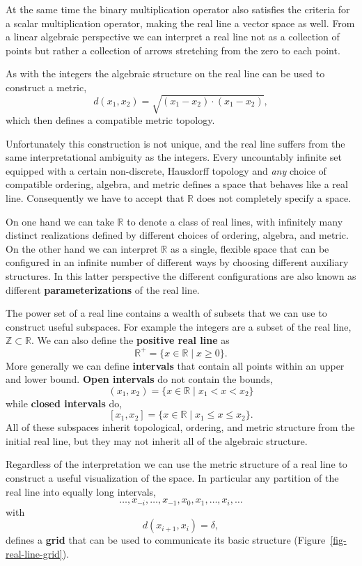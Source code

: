 \documentclass[
  letterpaper,
  DIV=11,
  numbers=noendperiod]{scrartcl}
\begin{document}
At the same time the binary multiplication operator also satisfies the
criteria for a scalar multiplication operator, making the real line a
vector space as well. From a linear algebraic perspective we can
interpret a real line not as a collection of points but rather a
collection of arrows stretching from the zero to each point.

As with the integers the algebraic structure on the real line can be
used to construct a metric, \[
d(x_{1}, x_{2}) = \sqrt{ (x_{1} - x_{2}) \cdot (x_{1} - x_{2}) },
\] which then defines a compatible metric topology.

Unfortunately this construction is not unique, and the real line suffers
from the same interpretational ambiguity as the integers. Every
uncountably infinite set equipped with a certain non-discrete, Hausdorff
topology and \emph{any} choice of compatible ordering, algebra, and
metric defines a space that behaves like a real line. Consequently we
have to accept that \(\mathbb{R}\) does not completely specify a space.

On one hand we can take \(\mathbb{R}\) to denote a class of real lines,
with infinitely many distinct realizations defined by different choices
of ordering, algebra, and metric. On the other hand we can interpret
\(\mathbb{R}\) as a single, flexible space that can be configured in an
infinite number of different ways by choosing different auxiliary
structures. In this latter perspective the different configurations are
also known as different \textbf{parameterizations} of the real line.

The power set of a real line contains a wealth of subsets that we can
use to construct useful subspaces. For example the integers are a subset
of the real line, \(\mathbb{Z} \subset \mathbb{R}\). We can also define
the \textbf{positive real line} as \[
\mathbb{R}^{+} = \{ x \in \mathbb{R} \mid x \ge 0 \}.
\] More generally we can define \textbf{intervals} that contain all
points within an upper and lower bound. \textbf{Open intervals} do not
contain the bounds, \[
(x_{1}, x_{2}) =
\{ x \in \mathbb{R} \mid x_{1} < x < x_{2} \}
\] while \textbf{closed intervals} do, \[
[x_{1}, x_{2}] =
\{ x \in \mathbb{R} \mid x_{1} \le x \le x_{2} \}.
\] All of these subspaces inherit topological, ordering, and metric
structure from the initial real line, but they may not inherit all of
the algebraic structure.

Regardless of the interpretation we can use the metric structure of a
real line to construct a useful visualization of the space. In
particular any partition of the real line into equally long intervals,
\[
\ldots, x_{-i}, \ldots, x_{-1}, x_{0}, x_{1}, \ldots, x_{i}, \ldots
\] with \[
d(x_{i + 1}, x_{i}) = \delta,
\] defines a \textbf{grid} that can be used to communicate its basic
structure (Figure~\ref{fig-real-line-grid}).
\end{document}
